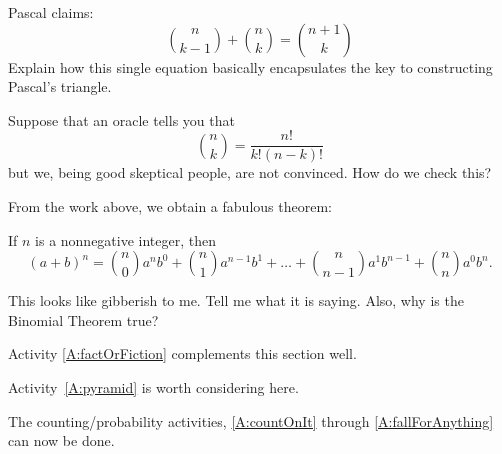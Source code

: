 \begin{question}
Pascal claims:
\[
\binom{n}{k-1} +  \binom{n}{k} = \binom{n+1}{k}
\]
Explain how this single equation basically encapsulates the key
to constructing Pascal's triangle.
\end{question}
\QM

\begin{question}
Suppose that an oracle tells you that
\[
\binom{n}{k} = \frac{n!}{k!(n-k)!}
\]
but we, being good skeptical people, are not convinced. How do we
check this?
\end{question}
\QM

From the work above, we obtain a fabulous theorem:


\begin{theorem} 
If $n$ is a nonnegative integer, then
\[
(a+b)^n = \binom{n}{0} a^nb^0 + \binom{n}{1} a^{n-1}b^1 + \dots + \binom{n}{n-1} a^{1}b^{n-1} + \binom{n}{n} a^{0}b^n.   
\]
\end{theorem}


\begin{question} 
This looks like gibberish to me. Tell me what it is saying. Also, why
is the Binomial Theorem true?
\end{question}
\QM



\begin{activitynote}
Activity \ref{A:factOrFiction} complements this section well.  %
\end{activitynote}


\begin{activitynote}
Activity~\ref{A:pyramid} is worth considering here.  %
\end{activitynote}


\begin{activitynote}
The counting/probability activities, \ref{A:countOnIt} through \ref{A:fallForAnything} can now be done.
\end{activitynote}



